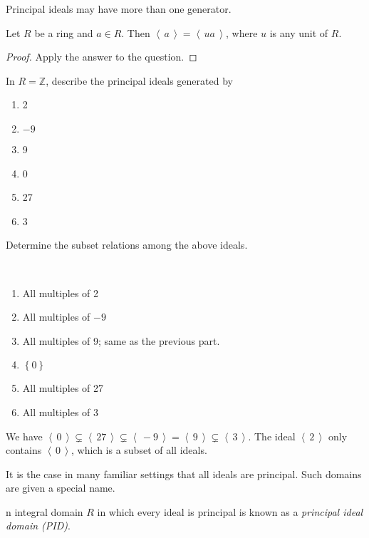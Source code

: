 \documentclass[english,course]{lecture}
\newcommand{\ideal}[1]{\left\langle\, #1 \,\right\rangle}
\newenvironment{solution}[1][Solution]{\begin{trivlist}\pushQED{\qed}\item[\hskip \labelsep  \bfseries #1{}.\hspace{10pt}]}{\popQED\end{trivlist}}\renewcommand{\qedsymbol}{$\checkmark$}{\newenvironment{answer}{\renewcommand\qedsymbol{$\blacklozenge$}\begin{proof}[Answer]}{\end{proof}}}\newenvironment{answer}[1][Answer]{\begin{trivlist}\pushQED{\qed}\item[\hskip \labelsep  \bfseries #1{}.\hspace{10pt}]}{\popQED\end{trivlist}}\renewcommand{\qedsymbol}{$\lozenge$}
\theoremstyle{plain}
\newenvironment{definition}[1]
  {\renewcommand\theinnerdefinition{#1}\innerdefinition}
  {\endinnerdefinition}
\def\set#1{\left\{ {#1} \right\}}
\def\Z{{\mathbb Z}}
\def\presnotes{}
\begin{document}
\presnotes


Principal ideals may have more than one generator.

\begin{theorem}
	Let $R$ be a ring and $a\in R$.
	Then $\ideal{a} = \ideal{ua}$, where $u$ is any unit of $R$.
\end{theorem}

\begin{proof}
	Apply the answer to the question.
\end{proof}

\presnotes

\begin{exer}
	In $R = \Z$, describe the principal ideals generated by
	\begin{enumerate}
		\item 2
		\item $-9$
		\item 9
		\item 0
		\item 27
		\item 3
	\end{enumerate}
	Determine the subset relations among the above ideals.
\end{exer}

\begin{solution}
	\
	\begin{enumerate}
	\item All multiples of 2
	\item All multiples of $-9$
	\item All multiples of 9; same as the previous part.
	\item $\set{0}$
	\item All multiples of 27
	\item All multiples of 3
\end{enumerate}



We have $\ideal{0}\subsetneq \ideal{27}\subsetneq  \ideal{-9} = \ideal{9} \subsetneq \ideal{3}$.
The ideal $\ideal{2}$ only contains $\ideal{0}$, which is a subset of all ideals.
\end{solution}

\presnotes

It is the case in many familiar settings that all ideals are principal.
Such domains are given a special name.

\begin{definition}
	An integral domain $R$ in which every ideal is principal is known as a \emph{principal ideal domain (PID)}.
\end{definition}
\end{document}
